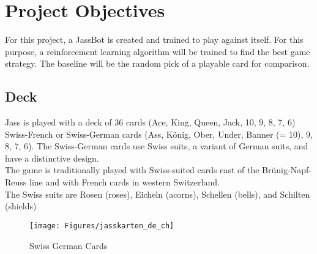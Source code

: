 
\chapter{Project Objectives} %

\label{Chapter1} %



For this project, a JassBot is created and trained to play against itself.
For this purpose, a reinforcement learning algorithm will be trained to find the best game strategy.
The baseline will be the random pick of a playable card for comparison.\\

\section{Deck \cite{jass}}
Jass is played with a deck of 36 cards (Ace, King, Queen, Jack, 10, 9, 8, 7, 6) Swiss-French or Swiss-German cards (Ass, König, Ober, Under, Banner (= 10), 9, 8, 7, 6). The Swiss-German cards use Swiss suits, a variant of German suits, and have a distinctive design.\\


The game is traditionally played with Swiss-suited cards east of the Brünig-Napf-Reuss line \cite{reuss} and with French cards in western Switzerland. \\
The Swiss suits are Rosen (roses), Eicheln (acorns), Schellen (bells), and Schilten (shields)
\begin{figure}[ht!]
    \centering
    \texttt{[image: Figures/jasskarten\_de\_ch]}
    \decoRule
    \caption[Swiss German Cards]{Swiss German Cards}
    \label{fig:SwissGermanCards}
\end{figure}



